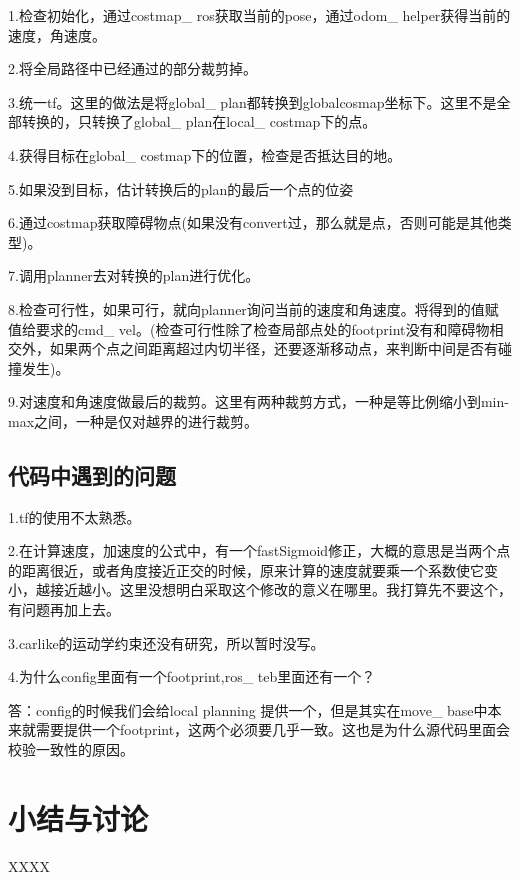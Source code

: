 \documentclass[10pt,a4paper]{article}
\theoremstyle{mythm}
\numberwithin{equation}{section}
\begin{document}
1.检查初始化，通过costmap\_ ros获取当前的pose，通过odom\_ helper获得当前的速度，角速度。

2.将全局路径中已经通过的部分裁剪掉。

3.统一tf。这里的做法是将global\_ plan都转换到globalcosmap坐标下。这里不是全部转换的，只转换了global\_ plan在local\_ costmap下的点。

4.获得目标在global\_ costmap下的位置，检查是否抵达目的地。

5.如果没到目标，估计转换后的plan的最后一个点的位姿

6.通过costmap获取障碍物点(如果没有convert过，那么就是点，否则可能是其他类型)。

7.调用planner去对转换的plan进行优化。

8.检查可行性，如果可行，就向planner询问当前的速度和角速度。将得到的值赋值给要求的cmd\_ vel。(检查可行性除了检查局部点处的footprint没有和障碍物相交外，如果两个点之间距离超过内切半径，还要逐渐移动点，来判断中间是否有碰撞发生)。

9.对速度和角速度做最后的裁剪。这里有两种裁剪方式，一种是等比例缩小到min-max之间，一种是仅对越界的进行裁剪。

\subsection{代码中遇到的问题}
1.tf的使用不太熟悉。

2.在计算速度，加速度的公式中，有一个fastSigmoid修正，大概的意思是当两个点的距离很近，或者角度接近正交的时候，原来计算的速度就要乘一个系数使它变小，越接近越小。这里没想明白采取这个修改的意义在哪里。我打算先不要这个，有问题再加上去。

3.carlike的运动学约束还没有研究，所以暂时没写。

4.为什么config里面有一个footprint,ros\_ teb里面还有一个？

答：config的时候我们会给local planning 提供一个，但是其实在move\_ base中本来就需要提供一个footprint，这两个必须要几乎一致。这也是为什么源代码里面会校验一致性的原因。
\section{小结与讨论}

\begin{thebibliography}{MM}
\addtolength{\itemsep}{-0.5em}
\begin{small}
 XXXX
\end{small}
\end{thebibliography}
\end{document}

